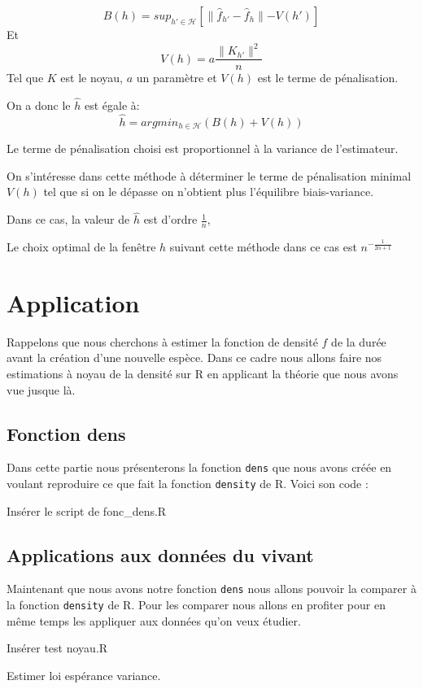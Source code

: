 \documentclass[
]{article}
\begin{document}
\[
B(h)=sup_{h' \in \mathcal H}{[\parallel\hat f_{h'} - \hat f _h \parallel-V(h')]}
\] Et \[
V(h)=a \frac{\parallel K_{h'}\parallel^2}{n}
\] Tel que \(K\) est le noyau, \(a\) un paramètre et \(V(h)\) est le
terme de pénalisation.\newline

On a donc le \(\hat h\) est égale à: \[
\hat h = arg min_{h \in \mathcal H}(B(h)+V(h))
\]

\begin{remark}
Le terme de pénalisation choisi est proportionnel à la variance de l'estimateur.
\end{remark}

On s'intéresse dans cette méthode à déterminer le terme de pénalisation
minimal \(V(h)\) tel que si on le dépasse on n'obtient plus l'équilibre
biais-variance.\newline

Dans ce cas, la valeur de \(\hat h\) est d'ordre \(\frac{1}{n}\),

Le choix optimal de la fenêtre \(h\) suivant cette méthode dans ce cas
est \(n^{-\frac{1}{2 \alpha +1}}\)

\section{Application}

Rappelons que nous cherchons à estimer la fonction de densité \(f\) de
la durée avant la création d'une nouvelle espèce. Dans ce cadre nous
allons faire nos estimations à noyau de la densité sur R en applicant la
théorie que nous avons vue jusque là.

\subsection{Fonction dens}

Dans cette partie nous présenterons la fonction \texttt{dens} que nous
avons créée en voulant reproduire ce que fait la fonction
\texttt{density} de R. Voici son code :

Insérer le script de fonc\_dens.R

\subsection{Applications aux données du vivant}

Maintenant que nous avons notre fonction \texttt{dens} nous allons
pouvoir la comparer à la fonction \texttt{density} de R. Pour les
comparer nous allons en profiter pour en même temps les appliquer aux
données qu'on veux étudier.

Insérer test noyau.R

Estimer loi espérance variance.
\end{document}
